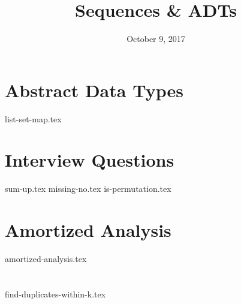 \documentclass[11pt]{exam}
\title{Sequences \& ADTs}
\date{October 9, 2017}
\begin{document}
\maketitle

\section{Abstract Data Types}
{list-set-map.tex}

\clearpage

\section{Interview Questions}
\begin{questions}
{sum-up.tex}
{missing-no.tex}
{is-permutation.tex}
\end{questions}

\clearpage

\section{Amortized Analysis}
\begin{questions}
{amortized-analysis.tex}
\end{questions}

\section{}
\begin{questions}
{find-duplicates-within-k.tex}
\end{questions}
\end{document}
